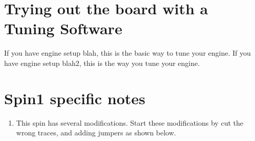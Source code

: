 \documentclass[12pt,a4paper,titlepage]{article}
\begin{document}
\section{Trying out the board with a Tuning Software}

If you have engine setup blah, this is the basic way to tune your engine.
If you have engine setup blah2, this is the way you tune your engine.

\section{Spin1 specific notes}

\begin{enumerate}
\item This spin has several modifications. Start these modifications by cut the wrong traces, and adding jumpers as shown below.


\end{enumerate}
\end{document}
